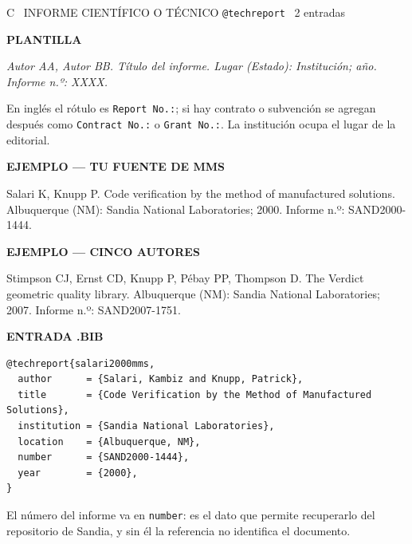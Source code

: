 \documentclass[11pt,a4paper]{article}
\newcommand{\rot}[1]{\vspace{2pt}\par{\footnotesize\bfseries\color{gris}\MakeUppercase{#1}}\par\vspace{1pt}}
\newcommand{\refv}[1]{\par{\small #1}\par}
\newcommand{\plantilla}[1]{\par{\small\itshape\color{tinta} #1}\par}
\newcommand{\anot}[1]{{\color{gris}\footnotesize #1}}
\begin{document}
\begin{ficha}{C \textperiodcentered\ INFORME CIENTÍFICO O TÉCNICO \hfill \normalfont\texttt{@techreport} \textperiodcentered\ 2 entradas}
\rot{plantilla}
\plantilla{Autor AA, Autor BB. Título del informe. Lugar (Estado): Institución; año. Informe
n.º: XXXX.}
\anot{En inglés el rótulo es \texttt{Report No.:}; si hay contrato o subvención se agregan
después como \texttt{Contract No.:} o \texttt{Grant No.:}. La institución ocupa el lugar de la
editorial.}

\rot{ejemplo --- tu fuente de MMS}
\refv{Salari K, Knupp P. Code verification by the method of manufactured solutions.
Albuquerque (NM): Sandia National Laboratories; 2000. Informe n.º: SAND2000-1444.}

\rot{ejemplo --- cinco autores}
\refv{Stimpson CJ, Ernst CD, Knupp P, Pébay PP, Thompson D. The Verdict geometric quality
library. Albuquerque (NM): Sandia National Laboratories; 2007. Informe n.º: SAND2007-1751.}

\rot{entrada .bib}
\begin{Verbatim}[fontsize=\small,xleftmargin=4pt]
@techreport{salari2000mms,
  author      = {Salari, Kambiz and Knupp, Patrick},
  title       = {Code Verification by the Method of Manufactured Solutions},
  institution = {Sandia National Laboratories},
  location    = {Albuquerque, NM},
  number      = {SAND2000-1444},
  year        = {2000},
}
\end{Verbatim}
\anot{El número del informe va en \texttt{number}: es el dato que permite recuperarlo del
repositorio de Sandia, y sin él la referencia no identifica el documento.}
\end{ficha}
\end{document}
